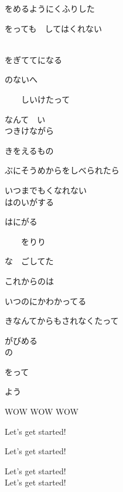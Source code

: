 をめるようにくふりした

をっても　してはくれない

\\

をぎててになる

のないへ

　　しいけたって

なんて　い
\\

つきけながら

きをえるもの

ぶにそうめからをしべられたら

いつまでもくなれない
\\

はのいがする

はにがる

　　をりり

な　ごしてた

これからのは

いつのにかわかってる

きなんてからもされなくたって

がびめる
\\

の

をって

よう

WOW WOW WOW

Let's get started!

Let's get started!

Let's get started!
\\

Let's get started!
\\

